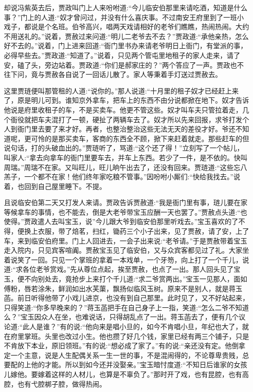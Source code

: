 


\begin{parag}
    却说冯紫英去后，贾政叫门上人来吩咐道:“今儿临安伯那里来请吃酒，知道是什么事？”门上的人道:“奴才曾问过，并没有什么喜庆事。不过南安王府里到了一班小戏子，都说是个名班。伯爷高兴，唱两天戏请相好的老爷们瞧瞧，热闹热闹。大约不用送礼的。”说着，贾赦过来问道:“明儿二老爷去不去？”贾政道:“承他亲热，怎么好不去的。”说着，门上进来回道:“衙门里书办来请老爷明日上衙门，有堂派的事，必得早些去。”贾政道:“知道了。”说着，只见两个管屯里地租子的家人走来，请了安，磕了头，旁边站着。贾政道:“你们是郝家庄的？”两个答应了一声。贾政也不往下问，竟与贾赦各自说了一回话儿散了。家人等秉着手灯送过贾赦去。
\end{parag}


\begin{parag}
    这里贾琏便叫那管租的人道:“说你的。”那人说道:“十月里的租子奴才已经赶上来了，原是明儿可到。谁知京外拿车，把车上的东西不由分说都掀在地下。奴才告诉他说是府里收租子的车，不是买卖车。他更不管这些。奴才叫车夫只管拉着走，几个衙役就把车夫混打了一顿，硬扯了两辆车去了。奴才所以先来回报，求爷打发个人到衙门里去要了来才好。再者，也整治整治这些无法无天的差役才好。爷还不知道呢，更可怜的是那买卖车，客商的东西全不顾，掀下来赶着就走。那些赶车的但说句话，打的头破血出的。”贾琏听了，骂道:“这个还了得！”立刻写了一个帖儿，叫家人:“拿去向拿车的衙门里要车去，并车上东西。若少了一件，是不依的。快叫周瑞。”周瑞不在家。又叫旺儿，旺儿晌午出去了，还没有回来。贾琏道:“这些忘八羔子，一个都不在家！他们终年家吃粮不管事。”因吩咐小厮们:“快给我找去。”说着，也回到自己屋里睡下。不提。
\end{parag}


\begin{parag}
    且说临安伯第二天又打发人来请。贾政告诉贾赦道:“我是衙门里有事，琏儿要在家等候拿车的事情，也不能去，倒是大老爷带宝玉应酬一天也罢了。”贾赦点头道:“也使得。”贾政遣人去叫宝玉，说”今儿跟大爷到临安伯那里听戏去。”宝玉喜欢的了不得，便换上衣服，带了焙茗，扫红，锄药三个小子出来，见了贾赦，请了安，上了车，来到临安伯府里。门上人回进去，一会子出来说:“老爷请。”于是贾赦带着宝玉走入院内，只见宾客喧阗。贾赦宝玉见了临安伯，又与众宾客都见过了礼。大家坐着说笑了一回。只见一个掌班的拿着一本戏单，一个牙笏，向上打了一个千儿，说道:“求各位老爷赏戏。”先从尊位点起，挨至贾赦，也点了一出。那人回头见了宝玉，便不向别处去，竟抢步上来打个千儿道:“求二爷赏两出。”宝玉一见那人，面如傅粉，唇若涂朱，鲜润如出水芙蕖，飘扬似临风玉树。原来不是别人，就是蒋玉菡。前日听得他带了小戏儿进京，也没有到自己那里。此时见了，又不好站起来，只得笑道:“你多早晚来的？”蒋玉菡把手在自己身子上一指，笑道:“怎么二爷不知道么？”宝玉因众人在坐，也难说话，只得胡乱点了一出。蒋玉菡去了，便有几个议论道:“此人是谁？”有的说:“他向来是唱小旦的，如今不肯唱小旦，年纪也大了，就在府里掌班。头里也改过小生。他也攒了好几个钱，家里已经有两三个铺子，只是不肯放下本业，原旧领班。”有的说:“想必成了家了。”有的说:“亲还没有定。他倒拿定一个主意，说是人生配偶关系一生一世的事，不是混闹得的，不论尊卑贵贱，总要配的上他的才能。所以到如今还并没娶亲。”宝玉暗忖度道:“不知日后谁家的女孩儿嫁他。要嫁着这样的人材儿，也算是不辜负了。”那时开了戏，也有昆腔，也有高腔，也有弋腔梆子腔，做得热闹。
\end{parag}


